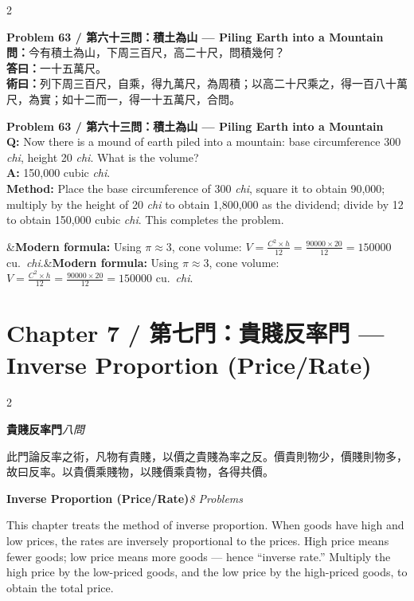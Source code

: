 \documentclass[11pt,a4paper]{article}
\newcommand{\bilingualproblem}[4]{%
  \begin{paracol}{2}
  \begin{leftcolumn}
  \noindent\textbf{\color{problemcolor}#1}\\[0.2cm]
  #2
  \end{leftcolumn}
  \switchcolumn
  \noindent\textbf{\color{problemcolor}#1}\\[0.2cm]
  #3
  \end{paracol}
  \ifx&#4&\else\vspace{0.3cm}\noindent#4\fi
  \vspace{0.5cm}
}
\newcommand{\wen}[1]{\textcolor{problemcolor}{\textbf{問：}}#1}
\newcommand{\da}[1]{\textcolor{answercolor}{\textbf{答曰：}}#1}
\newcommand{\shu}[1]{\textcolor{methodcolor}{\textbf{術曰：}}#1}
\newcommand{\wenen}[1]{\textcolor{problemcolor}{\textbf{Q:}} #1}
\newcommand{\daen}[1]{\textcolor{answercolor}{\textbf{A:}} #1}
\newcommand{\shuen}[1]{\textcolor{methodcolor}{\textbf{Method:}} #1}
\begin{document}
\bilingualproblem{Problem 63 / 第六十三問：積土為山 --- Piling Earth into a Mountain}{
\wen{今有積土為山，下周三百尺，高二十尺，問積幾何？}\\[0.2cm]
\da{一十五萬尺。}\\[0.2cm]
\shu{列下周三百尺，自乘，得九萬尺，為周積；以高二十尺乘之，得一百八十萬尺，為實；如十二而一，得一十五萬尺，合問。}
}{
\wenen{Now there is a mound of earth piled into a mountain: base circumference 300 \textit{chi}, height 20 \textit{chi}. What is the volume?}\\[0.2cm]
\daen{150,000 cubic \textit{chi}.}\\[0.2cm]
\shuen{Place the base circumference of 300 \textit{chi}, square it to obtain 90,000; multiply by the height of 20 \textit{chi} to obtain 1,800,000 as the dividend; divide by 12 to obtain 150,000 cubic \textit{chi}. This completes the problem.}
}{\textbf{Modern formula:} Using $\pi \approx 3$, cone volume: $V = \frac{C^2 \times h}{12} = \frac{90000 \times 20}{12} = 150000$ cu.\ \textit{chi}.}

\newpage

\section{Chapter 7 / 第七門：貴賤反率門 --- Inverse Proportion (Price/Rate)}
\label{sec:guijian}

\begin{paracol}{2}
\begin{leftcolumn}
\noindent\textbf{貴賤反率門}\quad\textit{八問}

此門論反率之術，凡物有貴賤，以價之貴賤為率之反。價貴則物少，價賤則物多，故曰反率。以貴價乘賤物，以賤價乘貴物，各得共價。
\end{leftcolumn}

\switchcolumn

\noindent\textbf{Inverse Proportion (Price/Rate)}\quad\textit{8 Problems}

This chapter treats the method of inverse proportion. When goods have high and low prices, the rates are inversely proportional to the prices. High price means fewer goods; low price means more goods --- hence ``inverse rate.'' Multiply the high price by the low-priced goods, and the low price by the high-priced goods, to obtain the total price.
\end{paracol}

\vspace{0.5cm}
\end{document}
